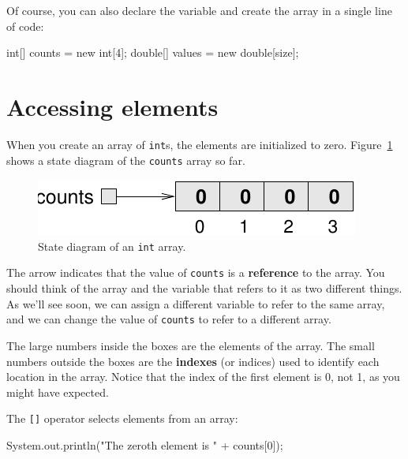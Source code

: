 \documentclass[12pt]{book}
\theoremstyle{exercise}
\newcommand{\java}[1]{\verb"#1"}
\begin{document}
Of course, you can also declare the variable and create the array in a single line of code:

\begin{code}
    int[] counts = new int[4];
    double[] values = new double[size];
\end{code}




\section{Accessing elements}


When you create an array of \java{int}s, the elements are initialized to zero.
Figure~\ref{fig.array} shows a state diagram of the \java{counts} array so far.


\begin{figure}
\begin{center}
\includegraphics{figs/array.pdf}
\caption{State diagram of an \java{int} array.}
\label{fig.array}
\end{center}
\end{figure}

The arrow indicates that the value of \java{counts} is a {\bf reference} to the array.
You should think of the array and the variable that refers to it as two different things.
As we'll see soon, we can assign a different variable to refer to the same array, and we can change the value of \java{counts} to refer to a different array.


The large numbers inside the boxes are the elements of the array.
The small numbers outside the boxes are the {\bf indexes} (or indices) used to identify each location in the array.
Notice that the index of the first element is 0, not 1, as you might have expected.

The \java{[]} operator selects elements from an array:

\begin{code}
    System.out.println("The zeroth element is " + counts[0]);
\end{code}
\end{document}

